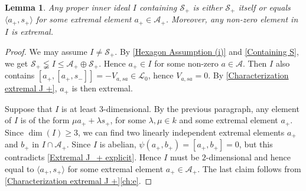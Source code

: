 \documentclass[oneside,a4paper]{amsart} %
\newtheorem{theorem}{Theorem}[section]
\newtheorem{lemma}[theorem]{Lemma}
\theoremstyle{definition}
\newcommand{\A}{\mathcal{A}}
\renewcommand{\SS}{\mathcal{S}}
\newcommand{\LL}{\mathcal{L}}
\numberwithin{equation}{section}
\begin{document}
\iffalse
\begin{theorem}
\label{Hexagon Assumption}
	The algebra $\A$ satisfies \cref{Assumption}.
\end{theorem}
\begin{proof}
	\Cref{Assumption}\cref{ass:V0} is taken care of by \cref{Hexagon Assumption (i)}.
	\Cref{Assumption}\cref{ass:skew} is obviously satisfied.
	Now consider $a\in\A$ with $V_{a,sa}=0$.
	Then by \cref{Characterization extremal J +}, $a_+$ is extremal.
	This implies $[a_+,[a_+,\LL_i]]=0$ if $i\neq -1$.
	So if $U_a=0$, then
	$a_+$ is an absolute zero divisor, contradicting \cref{A nondeg}; hence $U_a \neq 0$.
	Since $U_a(\A)\leq \langle a\rangle$, this implies $a\in U_a(\A)$.
	So \cref{Assumption}\cref{ass:Vasa} is satisfied as well.
	Finally notice that $\A$ is central simple by \cite[\S 4, Lemma 2.1]{Allison1984} .
\end{proof}
\fi 

\begin{lemma}
\label{Hexagon inner containing S_+}
	Any proper inner ideal $I$ containing $\SS_+$ is either $\SS_+$ itself or equals $\langle a_+,s_+ \rangle$ for some extremal element $a_+\in\A_+$. Moreover, any non-zero element in $I$ is extremal.
\end{lemma}
\begin{proof}
	We may assume $I \neq \SS_+$. 
	By \cref{Hexagon Assumption (i)} and \cref{Containing S}, we get $\SS_+ \lneqq I\leq \A_+\oplus \SS_+$.
	Hence $a_+\in I$ for some non-zero $a\in \A$.	
	Then $I$ also contains $[a_+,[a_+,s_-]]=-V_{a,sa} \in \LL_0$, hence $V_{a,sa}=0$. By \cref{Characterization extremal J +}, $a_+$ is then extremal.
	
	Suppose that $I$ is at least $3$-dimensional. 
	By the previous paragraph, any element of $I$ is of the form $\mu a_++\lambda s_+$, for some $\lambda,\mu\in k$ and some extremal element $a_+$. 
	Since $\dim(I)\geq 3$, we can find two linearly independent extremal elements $a_+$ and $b_+$ in $I \cap \A_+$.
	Since $I$ is abelian, $\psi(a_+,b_+)=[a_+,b_+]=0$, but this contradicts \cref{Extremal J_+ explicit}. 
	Hence $I$ must be $2$-dimensional and hence equal to $\langle a_+,s_+\rangle$ for some extremal element $a_+\in\A_+$.
	The last claim follows from \cref{Characterization extremal J +}\cref{ch:e}.
\end{proof}
\end{document}
